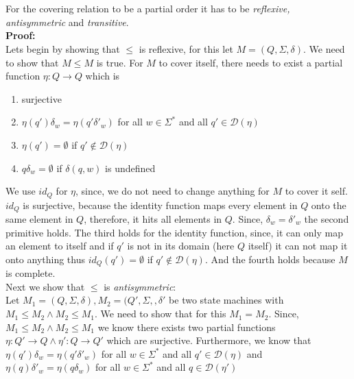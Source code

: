 \documentclass[a4paper,12pt,numbers=noenddot]{scrreport}
\begin{document}
\section{}
For the covering relation to be a partial order it has to be \textit{reflexive, antisymmetric} and \textit{transitive}.\\
\textbf{Proof:}\\
Lets begin by showing that $\le$ is reflexive, for this let $M = (Q, \Sigma, \delta)$. We need to show that $M \le M$ is true. For $M$ to cover itself, there needs to exist a partial function $\eta: Q \rightarrow Q$ which is \begin{enumerate}
    \item surjective
    \item $\eta(q')\delta_w = \eta(q'\delta'_w)$ for all $w \in \Sigma^*$ and all $q' \in \mathcal{D}(\eta)$
    \item $\eta(q') = \emptyset$ if $q' \notin \mathcal{D}(\eta)$
    \item $q\delta_w = \emptyset$ if $ \delta(q, w)$ is undefined
\end{enumerate}
We use $id_Q$ for $\eta$, since, we do not need to change anything for $M$ to cover it self. $id_Q$ is surjective, because the identity function maps every element in $Q$ onto the same element in $Q$, therefore, it hits all elements in $Q$. Since, $\delta_w = \delta'_w$ the second primitive holds. The third holds for the identity function, since, it can only map an element to itself and if $q'$ is not in its domain (here $Q$ itself) it can not map it onto anything thus $id_Q(q') = \emptyset$ if $q' \notin \mathcal{D}(\eta)$. And the fourth holds because $M$ is complete.\\
Next we show that $\le$ is \textit{antisymmetric}:\\ Let $M_1 = (Q, \Sigma, \delta), M_2=(Q', \Sigma, ,\delta'$ be two state machines with $M_1 \le M_2 \land M_2 \le M_1$. We need to show that for this $M_1 = M_2$. Since, $M_1 \le M_2 \land M_2 \le M_1$ we know there exists two partial functions $\eta : Q' \rightarrow Q \land \eta' : Q \rightarrow Q'$ which are surjective. Furthermore, we know that 
$\eta(q')\delta_w = \eta(q'\delta'_w) $ for all $ w\in \Sigma^* $ and all $ q' \in \mathcal{D}(\eta)$ and $\eta(q)\delta'_w = \eta(q\delta_w)$ for all $w \in \Sigma^*$ and all $q \in \mathcal{D}(\eta')$ 

\section{}
\end{document}
